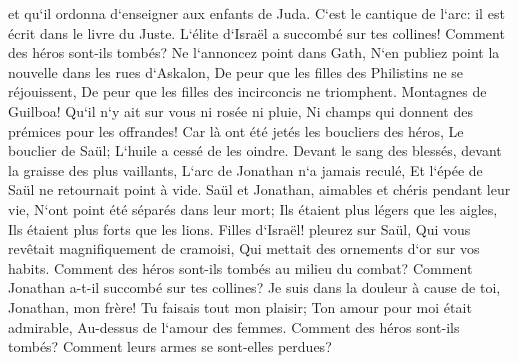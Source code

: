 \verse et qu`il ordonna d`enseigner aux enfants de Juda. C`est le cantique de l`arc: il est écrit dans le livre du Juste. 
\verse L`élite d`Israël a succombé sur tes collines! Comment des héros sont-ils tombés? 
\verse Ne l`annoncez point dans Gath, N`en publiez point la nouvelle dans les rues d`Askalon, De peur que les filles des Philistins ne se réjouissent, De peur que les filles des incirconcis ne triomphent. 
\verse Montagnes de Guilboa! Qu`il n`y ait sur vous ni rosée ni pluie, Ni champs qui donnent des prémices pour les offrandes! Car là ont été jetés les boucliers des héros, Le bouclier de Saül; L`huile a cessé de les oindre. 
\verse Devant le sang des blessés, devant la graisse des plus vaillants, L`arc de Jonathan n`a jamais reculé, Et l`épée de Saül ne retournait point à vide. 
\verse Saül et Jonathan, aimables et chéris pendant leur vie, N`ont point été séparés dans leur mort; Ils étaient plus légers que les aigles, Ils étaient plus forts que les lions. 
\verse Filles d`Israël! pleurez sur Saül, Qui vous revêtait magnifiquement de cramoisi, Qui mettait des ornements d`or sur vos habits. 
\verse Comment des héros sont-ils tombés au milieu du combat? Comment Jonathan a-t-il succombé sur tes collines? 
\verse Je suis dans la douleur à cause de toi, Jonathan, mon frère! Tu faisais tout mon plaisir; Ton amour pour moi était admirable, Au-dessus de l`amour des femmes. 
\verse Comment des héros sont-ils tombés? Comment leurs armes se sont-elles perdues? 

